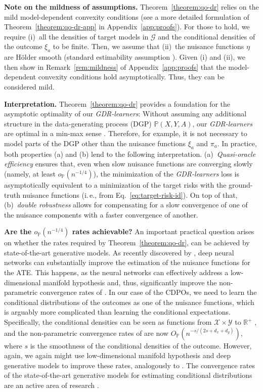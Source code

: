 \documentclass[dvipsnames]{article} %
\newcommand\ie{i.\,e.\xspace}
\newcommand{\GDRlearners}{\emph{GDR-learners}\xspace}
\newcommand{\CDPOs}{CDPOs\xspace}
\begin{document}
{\textbf{Note on the mildness of assumptions.} Theorem~\ref{theorem:qo-dr} relies on the mild model-dependent convexity conditions (see a more detailed formulation of Theorem~\ref{theorem:qo-dr-app} in Appendix~\ref{app:proofs}). For those to hold, we require (i)~all the densities of target models in $\mathcal{G}$ and the conditional densities of the outcome $\xi_a$ to be finite. Then, we assume that (ii)~the nuisance functions $\eta$ are H\"older smooth (standard estimability assumption \citep{kennedy2023towards}). Given (i) and (ii), we then show in Remark~\ref{rem:mildness} of Appendix~\ref{app:proofs} that the model-dependent convexity conditions hold asymptotically. Thus, they can be considered mild.}

\textbf{Interpretation.} Theorem~\ref{theorem:qo-dr} provides a foundation for the asymptotic optimality of our \GDRlearners: Without assuming any additional structure in the data-generating process (DGP) $\mathbb{P}(X, Y, A)$, our \GDRlearners are optimal in a min-max sense \citep{balakrishnan2023fundamental,jin2025structure}. Therefore, for example, it is not necessary to model parts of the DGP other than the nuisance functions $\xi_a$ and $\pi_a$. In practice, both properties (a) and (b) lend to the following interpretation. (a)~\emph{Quasi-oracle efficiency} ensures that, even when slow nuisance functions are converging slowly (namely, at least $o_\mathbb{P}(n^{-1/4})$), the minimization of the \GDRlearners loss is asymptotically equivalent to a minimization of the target risks with the ground-truth nuisance functions (\ie, from Eq.~\eqref{eq:target-risk-id}). On top of that, (b)~\emph{double robustness} allows for compensating for a slow convergence of one of the nuisance components with a faster convergence of another.

{\textbf{Are the $o_\mathbb{P}(n^{-1/4})$ rates achievable?} An important practical question arises on whether the rates required by Theorem~\ref{theorem:qo-dr}, can be achieved by state-of-the-art generative models.  As recently discovered by \citet{schulte2025adjustment}, deep neural networks can substantially improve the estimation of the nuisance functions for the ATE. This happens, as the neural networks can effectively address a low-dimensional manifold hypothesis and, thus, significantly improve the non-parametric convergence rates of \citet{stone1982optimal}. In our case of the \CDPOs, we need to learn the conditional distributions of the outcomes as one of the nuisance functions, which is arguably more complicated than learning the conditional expectations. Specifically, the conditional densities can be seen as functions from $\mathcal{X} \times \mathcal{Y}$ to $\mathbb{R}^+$ \citep{efromovich2007conditional}, and the non-parametric convergence rates of \citet{stone1982optimal} are now $O_{\mathbb{P}}(n^{-s/(2s + d_x + d_y)})$, where $s$ is the smoothness of the conditional densities of the outcome. However, again, we again might use low-dimensional manifold hypothesis and deep generative models to improve these rates, analogously to \citet{schulte2025adjustment}. The convergence rates of the state-of-the-art generative models for estimating conditional distributions are an active area of research \citep{kumar2025likelihood}.

}
\end{document}
